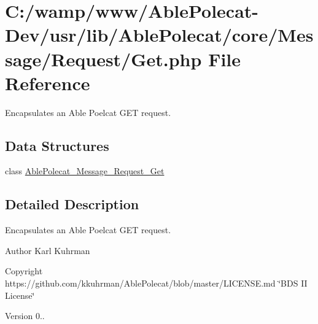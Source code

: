 \hypertarget{_get_8php}{}\section{C\+:/wamp/www/\+Able\+Polecat-\/\+Dev/usr/lib/\+Able\+Polecat/core/\+Message/\+Request/\+Get.php File Reference}
\label{_get_8php}


Encapsulates an Able Poelcat G\+E\+T request.  


\subsection*{Data Structures}
\begin{DoxyCompactItemize}
\item 
class \hyperlink{class_able_polecat___message___request___get}{Able\+Polecat\+\_\+\+Message\+\_\+\+Request\+\_\+\+Get}
\end{DoxyCompactItemize}


\subsection{Detailed Description}
Encapsulates an Able Poelcat G\+E\+T request. 

\begin{DoxyAuthor}{Author}
Karl Kuhrman 
\end{DoxyAuthor}
\begin{DoxyCopyright}{Copyright}
https\+://github.com/kkuhrman/\+Able\+Polecat/blob/master/\+L\+I\+C\+E\+N\+S\+E.\+md \char`\"{}\+B\+D\+S I\+I License\char`\"{} 
\end{DoxyCopyright}
\begin{DoxyVersion}{Version}
0.. 
\end{DoxyVersion}
